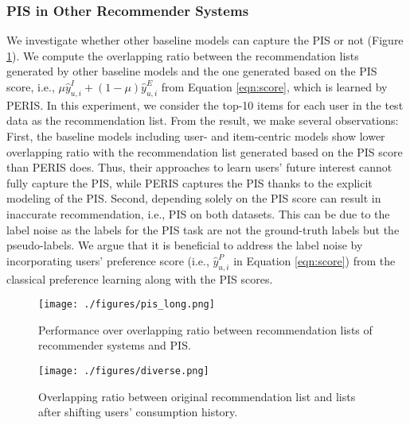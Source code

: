 \documentclass[sigconf]{acmart}
\newcommand{\MD}{{\small\textsf{PERIS}}}
\begin{document}
\subsubsection{\textbf{PIS in Other Recommender Systems}} We investigate whether other baseline models can capture the PIS or not (Figure \ref{fig:overlap}). We compute the overlapping ratio between the recommendation lists generated by other baseline models and the one generated based on the PIS score, i.e., $\mu \hat{y}_{u,i}^I + (1-\mu)\hat{y}_{u,i}^E$ from Equation \ref{eqn:score}, which is learned by \MD{}. In this experiment, we consider the top-10 items for each user in the test data as the recommendation list. From the result, we make several observations: First, the baseline models including user- and item-centric models show lower overlapping ratio with the recommendation list generated based on the PIS score than \MD{} does. Thus, their approaches to learn users' future interest cannot fully capture the PIS, while \MD{} captures the PIS thanks to the explicit modeling of the PIS. 
Second, depending solely on the PIS score can result in inaccurate recommendation, i.e., PIS on both datasets. This can be due to the label noise as the labels for the PIS task are not the ground-truth labels but the pseudo-labels. 
We argue that it is beneficial to address the label noise by incorporating users' preference score (i.e., $\hat{y}_{u,i}^P$ in Equation \ref{eqn:score}) from the classical preference learning along with the PIS scores.


\begin{figure}[t]
	\centering
	\texttt{[image: ./figures/pis\_long.png]}
	\caption{Performance over overlapping ratio between recommendation lists of recommender systems and PIS.  }
     \label{fig:overlap}
\end{figure}


\begin{figure}[t]
	\centering
	\texttt{[image: ./figures/diverse.png]}
	\caption{Overlapping ratio between original recommendation list and lists after shifting users' consumption history.}
	\label{fig:diverse}
\end{figure}
\end{document}
